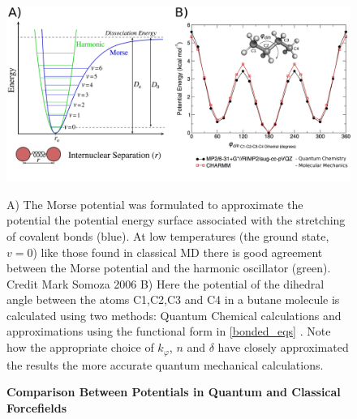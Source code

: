 \begin{figure}
	\begin{center}
	\includegraphics[width=\textwidth]{figures/QM_MM_compared.pdf}
	\end{center}
	\captionsetup{singlelinecheck = false, justification=raggedright}
	\caption[Comparison Between Potentials in Quantum and Classical Forcefields] {\textbf{Comparison Between Potentials in Quantum and Classical Forcefields}}{ A) The Morse potential was formulated to approximate the potential the potential energy surface associated with the stretching of covalent bonds (blue). At low temperatures (the ground state, $v=0$) like those found in classical MD there is good agreement between the Morse potential and the harmonic oscillator (green). Credit Mark Somoza 2006 B) Here the potential of the dihedral angle between the atoms C1,C2,C3 and C4 in a butane molecule is calculated using two methods: Quantum Chemical calculations and approximations using the functional form in \ref{bonded_eqs} \cite{lemkul2020}. Note how the appropriate choice of $k_\varphi$, $n$ and $\delta$ have closely approximated the results the more accurate quantum mechanical calculations.}
 
	\label{morse_potential}
\end{figure}

